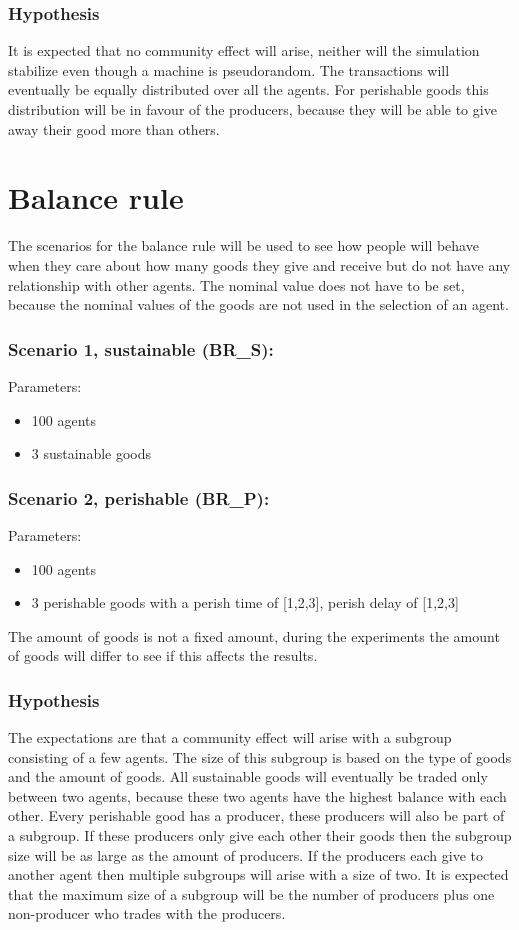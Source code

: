 \documentclass[twoside,openright]{uva-bachelor-thesis}
\begin{document}
\subsubsection{Hypothesis}
It is expected that no community effect will arise, neither will the simulation stabilize even though a machine is pseudorandom. The transactions will eventually be equally distributed over all the agents. For perishable goods this distribution will be in favour of the producers, because they will be able to give away their good more than others.

\section{Balance rule}
The scenarios for the balance rule will be used to see how people will behave when they care about how many goods they give and receive but do not have any relationship with other agents. The nominal value does not have to be set, because the nominal values of the goods are not used in the selection of an agent.
\subsubsection{Scenario 1, sustainable (BR\_S):}
Parameters:
\begin{itemize}
\item	100 agents
\item	3 sustainable goods
\end{itemize}
\subsubsection{Scenario 2, perishable (BR\_P):}
Parameters:
\begin{itemize}
\item	100 agents
\item	3 perishable goods with a perish time of [1,2,3], perish delay of [1,2,3]
\end{itemize}
The amount of goods is not a fixed amount, during the experiments the amount of goods will differ to see if this affects the results.

\subsubsection{Hypothesis}
The expectations are that a community effect will arise with a subgroup consisting of a few agents. The size of this subgroup is based on the type of goods and the amount of goods. All sustainable goods will eventually be traded only between two agents, because these two agents have the highest balance with each other. Every perishable good has a producer, these producers will also be part of a subgroup. If these producers only give each other their goods then the subgroup size will be as large as the amount of producers. If the producers each give to another agent then multiple subgroups will arise with a size of two. It is expected that the maximum size of a subgroup will be the number of producers plus one non-producer who trades with the producers.
\end{document}
